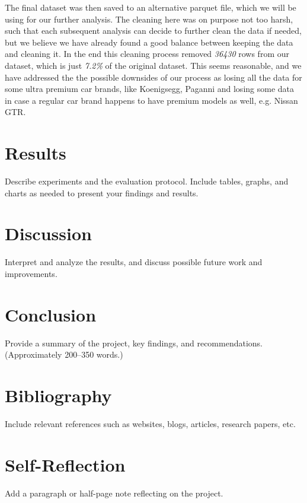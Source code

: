 \documentclass[12pt]{article}
\begin{document}
The final dataset was then saved to an alternative parquet file, which we will be using for our further analysis. The cleaning here was on purpose not too harsh, such that each subsequent analysis can decide to further clean the data if needed, but we believe we have already found a good balance between keeping the data and cleaning it.
In the end this cleaning process removed \textit{36430} rows from our dataset, which is just \textit{7.2\%} of the original dataset. This seems reasonable, and we have addressed the the possible downsides of our process as losing all the data for some ultra premium car brands, like Koenigsegg, Paganni and losing some data in case a regular car brand happens to have premium models as well, e.g. Nissan GTR.

\section{Results}
Describe experiments and the evaluation protocol. Include tables, graphs, and charts as needed to present your findings and results.

\section{Discussion}
Interpret and analyze the results, and discuss possible future work and improvements.

\section{Conclusion}
Provide a summary of the project, key findings, and recommendations. (Approximately 200--350 words.)

\section{Bibliography}
Include relevant references such as websites, blogs, articles, research papers, etc.

\printbibliography

\section{Self-Reflection}
Add a paragraph or half-page note reflecting on the project.
\end{document}
